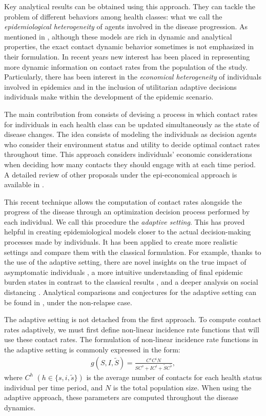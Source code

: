 \documentclass[sn-basic]{sn-jnl}%
\theoremstyle{thmstyleone}%
\theoremstyle{thmstyletwo}%
\theoremstyle{thmstylethree}%
\newcommand{\wS}{\widetilde{S}}
\newcommand{\ws}{\widetilde{s}}
\begin{document}
Key analytical results can be obtained using this approach. They can tackle the problem of different behaviors among health classes: what we call the \textit{epidemiological heterogeneity} of agents involved in the disease progression. As mentioned in \cite{Funk10}, although these models are rich in dynamic and analytical properties, the exact contact dynamic behavior sometimes is not emphasized in their formulation. In recent years new interest has been placed in representing more dynamic information on contact rates from the population of the study. Particularly, there has been interest in the \textit{economical heterogeneity} of individuals involved in epidemics and in the inclusion of utilitarian adaptive decisions individuals make within the development of the epidemic scenario.

The main contribution from \cite{Feni11} consists of devising a process in which contact rates for individuals in each health class can be updated simultaneously as the state of disease changes. The idea consists of modeling the individuals as decision agents who consider their environment status and utility to decide optimal contact rates throughout time. This approach considers individuals' economic considerations when deciding how many contacts they should engage with at each time period. A detailed review of other proposals under the epi-economical approach is available in \cite{Funk10}.

This recent technique allows the computation of contact rates alongside the progress of the disease through an optimization decision process performed by each individual. We call this procedure the \textit{adaptive setting}. This has proved helpful in creating epidemiological models closer to the actual decision-making processes made by individuals. It has been applied to create more realistic settings and compare them with the classical formulation. For example, thanks to the use of the adaptive setting, there are novel insights on the true impact of asymptomatic individuals \cite{Balt2}, a more intuitive understanding of final epidemic burden states in contrast to the classical results \cite{Balt1}, and a deeper analysis on social distancing \cite{Feni11_2}. Analytical comparisons and conjectures for the adaptive setting can be found in \cite{CCast13}, under the non-relapse case.

The adaptive setting is not detached from the first approach. To compute contact rates adaptively, we must first define non-linear incidence rate functions that will use these contact rates. The formulation of non-linear incidence rate functions in the adaptive setting is commonly expressed in the form:
\begin{align}\label{C_orig}
    g(S,I,\wS)= \frac{C^sC^iN}{SC^s + IC^i + \wS C^{\ws}},
\end{align}
where $C^h$ $(h\in\{s,i,\ws\})$ is the average number of contacts for each health status individual per time period, and $N$ is the total population size. When using the adaptive approach, these parameters are computed throughout the disease dynamics.
\end{document}
